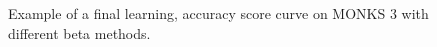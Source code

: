 \begin{appendices}
            \begin{figure}[H]
                \centering
                \begin{subfigure}{0.40\textwidth}
                    \caption{}
                    \label{fig:monks_3_MSE_CGD}
                \end{subfigure}
                \begin{subfigure}{0.40\textwidth}
                    \caption{}
                    \label{fig:monks_3_ACC_CGD}
                \end{subfigure}
                \caption{Example of a final learning, accuracy score curve on MONKS 3 with different beta methods.}
                \label{fig:monks_3_CGD}
            \end{figure}


\end{appendices}
